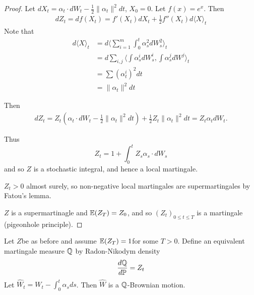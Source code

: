 \begin{proof}
  Let $dX_{t} = \alpha_{t} \cdot dW_{t} - \frac{1}{2} \| \alpha_{t}
  \|^{2} dt$, $X_{0} = 0$. Let $f(x) = e^{x}$.  Then
  \begin{align}
    \label{eq:49}
    dZ_{t} = df(X_{t}) = f'(X_{t}) dX_{t} + \frac{1}{2} f''(X_{t})
    d\langle X \rangle_{t}
  \end{align}
  Note that
  \begin{align}
    \label{eq:50}
    d \langle X \rangle_{t} &= d \langle \sum_{i=1}^{m} \int_{0}^{t}
    \alpha_{s}^{2} dW_{s}^{2} \rangle_{t} \\
    &= d \sum_{i, j} \langle \int \alpha_{s}^{i} dW^{i}_{s}, \int \alpha_{s}^{j}
    dW^{j} \rangle_{t} \\
    &= \sum (\alpha_{t}^{i})^{2} dt \\
    &= \| \alpha_{t} \|^{2} dt
  \end{align}

  Then
  \begin{align}
    \label{eq:51}
    dZ_{t} = Z_{t} \left(\alpha_{t} \cdot dW_{t} - \frac{1}{2} \|
      \alpha_{t} \|^{2} dt \right) + \frac{1}{2} Z_{t} \| \alpha_{t}
    \|^{2} dt = Z_{t} \alpha_{t} dW_{t}.
  \end{align}

  Thus
  \begin{equation}
    \label{eq:52}
    Z_{t} = 1 + \int_{0}^{t} Z_{s} \alpha_{s} \cdot dW_{s}
  \end{equation} and so $Z$ is a stochastic integral, and hence a
  local martingale.

  $Z_{t} > 0$ almost surely, so non-negative local martingales are
  supermartingales by Fatou's lemma.

  $Z$ is a supermartinagle and $\E{Z_{T}} = Z_{0}$, and so $(Z_{t})_{0
  \leq t \leq T}$ is a martingale (pigeonhole principle).
\end{proof}

\begin{thm}
  \label{defn:continuous_time:15}
  Let $Z$be as before and assume $\E{Z_{T}} = 1$for some $T > 0$.
  Define an equivalent martingale measure $\Q$ by Radon-Nikodym
  density
  \begin{equation}
    \label{eq:53}
    \frac{d\Q}{d\Prob} = Z_{t}
  \end{equation}  Let $\hat W_{t} = W_{t} - \int_{0}^{t} \alpha_{s}
  ds$.  Then $\hat W$ is a $\Q$-Brownian motion.
\end{thm}


